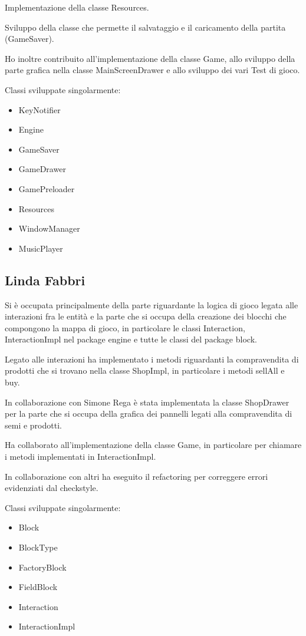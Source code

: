 \documentclass[a4paper,12pt]{report}
\begin{document}
Implementazione della classe Resources. 
 
Sviluppo della classe che permette il salvataggio e il caricamento della partita (GameSaver).

\hfill\break
Ho inoltre contribuito all'implementazione della classe Game, allo sviluppo della parte grafica nella classe MainScreenDrawer e allo sviluppo dei vari Test di gioco.

\hfill\break
Classi sviluppate singolarmente:
{
\begin{itemize}
	\item KeyNotifier
	\item Engine
	\item GameSaver
	\item GameDrawer
	\item GamePreloader
	\item Resources
	\item WindowManager
	\item MusicPlayer
\end{itemize}
}

\subsection{Linda Fabbri}

Si è occupata principalmente della parte riguardante la logica di gioco legata alle interazioni fra le entità e la parte che si occupa della creazione dei blocchi che compongono la mappa di gioco, in particolare le classi Interaction, InteractionImpl nel package engine e tutte le classi del package block. 

Legato alle interazioni ha implementato i metodi riguardanti la compravendita di prodotti che si trovano nella classe ShopImpl, in particolare i metodi sellAll e buy. 

In collaborazione con Simone Rega è stata implementata la classe ShopDrawer per la parte che si occupa della grafica dei pannelli legati alla compravendita di semi e prodotti. 

Ha collaborato all’implementazione della classe Game, in particolare per chiamare i metodi implementati in InteractionImpl. 

In collaborazione con altri ha eseguito il refactoring per correggere errori evidenziati dal checkstyle.

\hfill\break
Classi sviluppate singolarmente:
{
	\begin{itemize}
		\item Block
		\item BlockType
		\item FactoryBlock
		\item FieldBlock
		\item Interaction
		\item InteractionImpl
	\end{itemize}
}
\hfill\break
\end{document}
